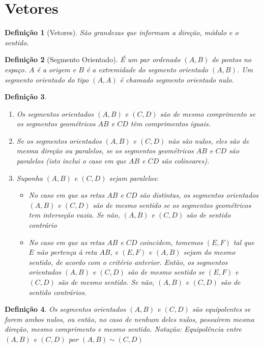 \documentclass[oneside,a4paper,12pt]{article}
\newtheorem{definition}{Definição}[section]
\begin{document}
\newpage
\section{Vetores}

\begin{definition}[Vetores]
	São grandezas que informam a direção, módulo e o sentido.
\end{definition}

\begin{definition}[Segmento Orientado]
	É um par ordenado $(A,B)$ de pontos no espaço. $A$ é a \emph{origem} e $B$ é a \emph{extremidade} do segmento orientado $(A,B)$. Um segmento orientado do tipo $(A,A)$ é chamado \emph{segmento orientado nulo}.
\end{definition}

\begin{definition}
	\begin{enumerate}
		\item Os segmentos orientados $(A,B)$ e $(C,D)$ são \emph{de mesmo comprimento} se os segmentos geométricos $AB$ e $CD$ têm comprimentos iguais.
		\item Se os segmentos orientados $(A,B)$ e $(C,D)$ não são nulos, eles são \emph{de mesma direção} ou \emph{paralelos}, se os segmentos geométricos $AB$ e $CD$ são paralelos (isto inclui o caso em que $AB$ e $CD$ são colineares).
		\item Suponha $(A,B)$ e $(C,D)$ sejam paralelos:
		\begin{itemize}
			\item No caso em que as retas $AB$ e $CD$ são distintas, os segmentos orientados $(A,B)$ e $(C,D)$ são \emph{de mesmo sentido} se os segmentos geométricos tem interseção vazia. Se não, $(A,B)$ e $(C,D)$ são de sentido contrário
			\item No caso em que as retas $AB$ e $CD$ coincidem, tomemos $(E,F)$ tal que $E$ não pertença à reta $AB$, e $(E,F)$ e $(A,B)$ sejam do mesmo sentido, de acordo com o critério anterior. Então, os segmentos orientados $(A,B)$ e $(C,D)$ são \emph{de mesmo sentido} se $(E,F)$ e $(C,D)$ são de mesmo sentido. Se não, $(A,B)$ e $(C,D)$ são \emph{de sentido contrários}.
		\end{itemize}
	\end{enumerate}
\end{definition}

\begin{definition}
	Os segmentos orientados $(A,B)$ e $(C,D)$ são \emph{equipolentes} se forem ambos nulos, ou então, no caso de nenhum deles nulos, possuírem mesma direção, mesmo comprimento e mesmo sentido. Notação: Equipolência entre $(A,B)$ e $(C,D)$ por $(A,B) \sim (C,D)$
\end{definition}
\end{document}

